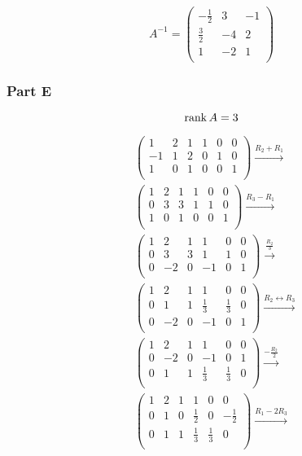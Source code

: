 \documentclass[12pt,titlepage]{extarticle}
\begin{document}
\[
    A^{-1} = \left(\begin{array}{ccc}-\frac{1}{2}&3&-1\\\frac{3}{2}&-4&2\\1&-2&1\\\end{array}\right)
\]

\subsubsection*{Part E}
\[
    \rank A = 3
\]

\begin{align*}
    &\left(\begin{array}{cccccc}1&2&1&1&0&0\\-1&1&2&0&1&0\\1&0&1&0&0&1\\\end{array}\right) \xrightarrow{R_2 + R_1} \\
    &\left(\begin{array}{cccccc}1&2&1&1&0&0\\0&3&3&1&1&0\\1&0&1&0&0&1\\\end{array}\right) \xrightarrow{R_3 - R_1} \\
    & \left(\begin{array}{cccccc}1&2&1&1&0&0\\0&3&3&1&1&0\\0&-2&0&-1&0&1\\\end{array}\right) \xrightarrow{\frac{R_2}{3}} \\
    & \left(\begin{array}{cccccc}1&2&1&1&0&0\\0&1&1&\frac{1}{3}&\frac{1}{3}&0\\0&-2&0&-1&0&1\\\end{array}\right) \xrightarrow{R_2 \leftrightarrow R_3} \\
    & \left(\begin{array}{cccccc}1&2&1&1&0&0\\0&-2&0&-1&0&1\\0&1&1&\frac{1}{3}&\frac{1}{3}&0\\\end{array}\right) \xrightarrow{-\frac{R_2}{2}} \\
    & \left(\begin{array}{cccccc}1&2&1&1&0&0\\0&1&0&\frac{1}{2}&0&-\frac{1}{2}\\0&1&1&\frac{1}{3}&\frac{1}{3}&0\\\end{array}\right) \xrightarrow{R_1 - 2 R_3} \\

\end{align*}
\end{document}
